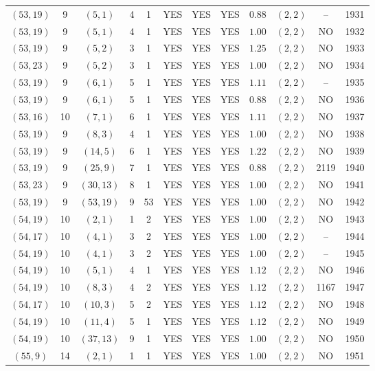 \begin{longtable}{|c|c|c|c|c|c|c|c|c|c|c|c|}
$(53,19)$ & 9 & $(5,1)$ & 4 & 1 & YES & YES & YES & $0.88$ & $(2,2)$ & -- & 1931\\
$(53,19)$ & 9 & $(5,1)$ & 4 & 1 & YES & YES & YES & $1.00$ & $(2,2)$ & NO & 1932\\
$(53,19)$ & 9 & $(5,2)$ & 3 & 1 & YES & YES & YES & $1.25$ & $(2,2)$ & NO & 1933\\
$(53,23)$ & 9 & $(5,2)$ & 3 & 1 & YES & YES & YES & $1.00$ & $(2,2)$ & NO & 1934\\
$(53,19)$ & 9 & $(6,1)$ & 5 & 1 & YES & YES & YES & $1.11$ & $(2,2)$ & -- & 1935\\
$(53,19)$ & 9 & $(6,1)$ & 5 & 1 & YES & YES & YES & $0.88$ & $(2,2)$ & NO & 1936\\
$(53,16)$ & 10 & $(7,1)$ & 6 & 1 & YES & YES & YES & $1.11$ & $(2,2)$ & NO & 1937\\
$(53,19)$ & 9 & $(8,3)$ & 4 & 1 & YES & YES & YES & $1.00$ & $(2,2)$ & NO & 1938\\
$(53,19)$ & 9 & $(14,5)$ & 6 & 1 & YES & YES & YES & $1.22$ & $(2,2)$ & NO & 1939\\
$(53,19)$ & 9 & $(25,9)$ & 7 & 1 & YES & YES & YES & $0.88$ & $(2,2)$ & 2119 & 1940\\
$(53,23)$ & 9 & $(30,13)$ & 8 & 1 & YES & YES & YES & $1.00$ & $(2,2)$ & NO & 1941\\
$(53,19)$ & 9 & $(53,19)$ & 9 & 53 & YES & YES & YES & $1.00$ & $(2,2)$ & NO & 1942\\
$(54,19)$ & 10 & $(2,1)$ & 1 & 2 & YES & YES & YES & $1.00$ & $(2,2)$ & NO & 1943\\
$(54,17)$ & 10 & $(4,1)$ & 3 & 2 & YES & YES & YES & $1.00$ & $(2,2)$ & -- & 1944\\
$(54,19)$ & 10 & $(4,1)$ & 3 & 2 & YES & YES & YES & $1.00$ & $(2,2)$ & -- & 1945\\
$(54,19)$ & 10 & $(5,1)$ & 4 & 1 & YES & YES & YES & $1.12$ & $(2,2)$ & NO & 1946\\
$(54,19)$ & 10 & $(8,3)$ & 4 & 2 & YES & YES & YES & $1.12$ & $(2,2)$ & 1167 & 1947\\
$(54,17)$ & 10 & $(10,3)$ & 5 & 2 & YES & YES & YES & $1.12$ & $(2,2)$ & NO & 1948\\
$(54,19)$ & 10 & $(11,4)$ & 5 & 1 & YES & YES & YES & $1.12$ & $(2,2)$ & NO & 1949\\
$(54,19)$ & 10 & $(37,13)$ & 9 & 1 & YES & YES & YES & $1.00$ & $(2,2)$ & NO & 1950\\
$(55,9)$ & 14 & $(2,1)$ & 1 & 1 & YES & YES & YES & $1.00$ & $(2,2)$ & NO & 1951\\

\end{longtable}
